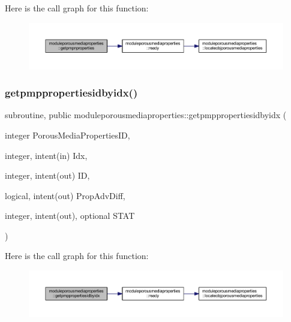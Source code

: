 Here is the call graph for this function\+:\nopagebreak
\begin{figure}[H]
\begin{center}
\leavevmode
\includegraphics[width=350pt]{namespacemoduleporousmediaproperties_a91af77c6bf746b618fd509c6ceb5b42d_cgraph}
\end{center}
\end{figure}
\mbox{\label{namespacemoduleporousmediaproperties_af2bce43f88ee94ebe28c4b5f01c9f098}} 
\subsubsection{\texorpdfstring{getpmppropertiesidbyidx()}{getpmppropertiesidbyidx()}}
{\footnotesize\ttfamily subroutine, public moduleporousmediaproperties\+::getpmppropertiesidbyidx (\begin{DoxyParamCaption}\item[{integer}]{Porous\+Media\+Properties\+ID,  }\item[{integer, intent(in)}]{Idx,  }\item[{integer, intent(out)}]{ID,  }\item[{logical, intent(out)}]{Prop\+Adv\+Diff,  }\item[{integer, intent(out), optional}]{S\+T\+AT }\end{DoxyParamCaption})}

Here is the call graph for this function\+:\nopagebreak
\begin{figure}[H]
\begin{center}
\leavevmode
\includegraphics[width=350pt]{namespacemoduleporousmediaproperties_af2bce43f88ee94ebe28c4b5f01c9f098_cgraph}
\end{center}
\end{figure}
\mbox{\label{namespacemoduleporousmediaproperties_a2c248d4114a4213bca448f9d77478f28}} 
